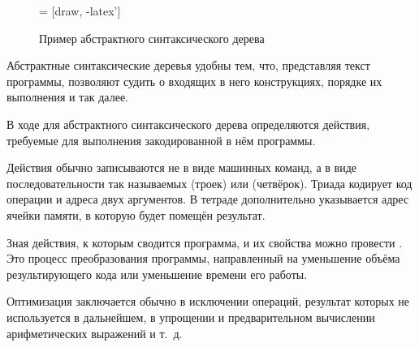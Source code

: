 \begin{figure}
  \begin{centering}
     = [draw, -latex']
    
    \par
  \end{centering}

  \caption{Пример абстрактного синтаксического дерева\label{fig:ast}}
\end{figure}

Абстрактные синтаксические деревья удобны тем, что, представляя текст
программы, позволяют судить о входящих в него конструкциях, порядке их
выполнения и так далее.

В ходе  для
абстрактного синтаксического дерева определяются действия, требуемые
для выполнения закодированной в нём программы.

Действия обычно записываются не в виде машинных команд, а в виде
последовательности так называемых  (троек) или
 (четвёрок). Триада кодирует код операции и
адреса двух аргументов. В тетраде дополнительно указывается адрес
ячейки памяти, в которую будет помещён результат.

Зная действия, к которым сводится программа, и их свойства можно
провести . Это процесс преобразования
программы, направленный на уменьшение объёма результирующего кода или
уменьшение времени его работы.

Оптимизация заключается обычно в исключении операций, результат
которых не используется в дальнейшем, в упрощении и предварительном
вычислении арифметических выражений и т.~д.

